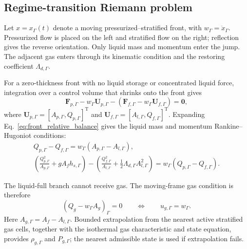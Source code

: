 \subsection{Regime-transition Riemann problem}
\label{sec:model:front}

Let $x=x_\Gamma(t)$ denote a moving pressurized--stratified front, with
$w_\Gamma=\dot x_\Gamma$. Pressurized flow is placed on the left and
stratified flow on the right; reflection gives the reverse orientation. Only
liquid mass and momentum enter the jump. The adjacent gas enters through its
kinematic condition and the restoring coefficient $\Lambda_{d,\Gamma}$.

For a zero-thickness front with no liquid storage or concentrated liquid
force, integration over a control volume that shrinks onto the front gives
\begin{equation}
\mathbf F_{p,\Gamma}-w_\Gamma\mathbf U_{p,\Gamma}
-\left(\mathbf F_{f,\Gamma}-w_\Gamma\mathbf U_{f,\Gamma}\right)
=\mathbf 0,
\label{eq:front_relative_balance}
\end{equation}
where $\mathbf U_{p,\Gamma}=[A_{p,\Gamma},Q_{p,\Gamma}]^{\mathrm T}$ and
$\mathbf U_{f,\Gamma}=[A_{l,\Gamma},Q_{f,\Gamma}]^{\mathrm T}$. Expanding
Eq.~\eqref{eq:front_relative_balance} gives the liquid mass and momentum
Rankine--Hugoniot conditions:
\begin{equation}
\begin{gathered}
Q_{p,\Gamma}-Q_{f,\Gamma}
=w_\Gamma\left(A_{p,\Gamma}-A_{l,\Gamma}\right),\\[4pt]
\left(\frac{Q_{p,\Gamma}^2}{A_{p,\Gamma}}+gA_fh_{s,\Gamma}\right)
-\left(\frac{Q_{f,\Gamma}^2}{A_{l,\Gamma}}
+\frac12\Lambda_{d,\Gamma}A_{l,\Gamma}^2\right)
=w_\Gamma\left(Q_{p,\Gamma}-Q_{f,\Gamma}\right).
\end{gathered}
\label{eq:front_jump}
\end{equation}

The liquid-full branch cannot receive gas. The moving-frame gas condition is
therefore
\begin{equation}
\left(Q_g-w_\Gamma A_g\right)_\Gamma=0
\qquad\Longleftrightarrow\qquad
u_{g,\Gamma}=w_\Gamma.
\label{eq:front_gas_condition}
\end{equation}
Here $A_{g,\Gamma}=A_f-A_{l,\Gamma}$. Bounded extrapolation from the nearest
active stratified gas cells, together with the isothermal gas characteristic
and state equation, provides $\rho_{g,\Gamma}$ and $P_{g,\Gamma}$; the nearest
admissible state is used if extrapolation fails.

